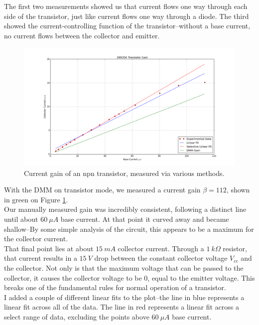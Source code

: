 \documentclass[11pt]{article}
\begin{document}
The first two measurements showed us that current flows one way through each side of the transistor, just like current flows one way through a diode. The third showed the current-controlling function of the transistor--without a base current, no current flows between the collector and emitter.\\

\begin{figure}[H]
    \centering
    \includegraphics[scale=0.4]{Plots/fig1.png}
    \caption{Current gain of an npn transistor, measured via various methods.}
    \label{fig:1}
\end{figure}

With the DMM on transistor mode, we measured a current gain $\beta = 112$, shown in green on Figure \ref{fig:1}.\\

Our manually measured gain was incredibly consistent, following a distinct line until about $60\ \mu A$ base current. At that point it curved away and became shallow--By some simple analysis of the circuit, this appears to be a maximum for the collector current. \\

That final point lies at about $15\ mA$ collector current. Through a $1\ k \Omega$ resistor, that current results in a $15\ V$ drop between the constant collector voltage $V_{cc}$ and the collector. Not only is that the maximum voltage that can be passed to the collector, it causes the collector voltage to be 0, equal to the emitter voltage. This breaks one of the fundamental rules for normal operation of a transistor.\\

I added a couple of different linear fits to the plot--the line in blue represents a linear fit across all of the data. The line in red represents a linear fit across a select range of data, excluding the points above $60\ \mu A$ base current.\\
\end{document}
